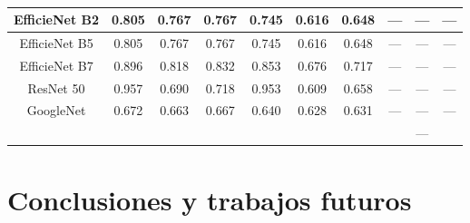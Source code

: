 \documentclass[a4paper,12pt,twoside,titlepage]{article}
\begin{document}
\begin{table}[h!]
\begin{tabular}{cccccccccc}
  \multicolumn{1}{|c|}{EfficieNet B2}          & \multicolumn{1}{c|}{0.805} & \multicolumn{1}{c|}{0.767} & \multicolumn{1}{c|}{0.767}      & \multicolumn{1}{c|}{0.745} & \multicolumn{1}{c|}{0.616} & \multicolumn{1}{c|}{0.648}      & \multicolumn{1}{c|}{---}   & \multicolumn{1}{c|}{---}   & \multicolumn{1}{c|}{---}        \\ \hline
  \multicolumn{1}{|c|}{EfficieNet B5}          & \multicolumn{1}{c|}{0.805} & \multicolumn{1}{c|}{0.767} & \multicolumn{1}{c|}{0.767}      & \multicolumn{1}{c|}{0.745} & \multicolumn{1}{c|}{0.616} & \multicolumn{1}{c|}{0.648}      & \multicolumn{1}{c|}{---}   & \multicolumn{1}{c|}{---}   & \multicolumn{1}{c|}{---}        \\ \hline
  \multicolumn{1}{|c|}{EfficieNet B7}          & \multicolumn{1}{c|}{0.896} & \multicolumn{1}{c|}{0.818} & \multicolumn{1}{c|}{0.832}      & \multicolumn{1}{c|}{0.853} & \multicolumn{1}{c|}{0.676} & \multicolumn{1}{c|}{0.717}      & \multicolumn{1}{c|}{---}   & \multicolumn{1}{c|}{---}   & \multicolumn{1}{c|}{---}        \\ \hline
  \multicolumn{1}{|c|}{ResNet 50}              & \multicolumn{1}{c|}{0.957} & \multicolumn{1}{c|}{0.690} & \multicolumn{1}{c|}{0.718}      & \multicolumn{1}{c|}{0.953} & \multicolumn{1}{c|}{0.609} & \multicolumn{1}{c|}{0.658}      & \multicolumn{1}{c|}{---}   & \multicolumn{1}{c|}{---}   & \multicolumn{1}{c|}{---}        \\ \hline
  \multicolumn{1}{|c|}{GoogleNet}              & \multicolumn{1}{c|}{0.672} & \multicolumn{1}{c|}{0.663} & \multicolumn{1}{c|}{0.667}      & \multicolumn{1}{c|}{0.640} & \multicolumn{1}{c|}{0.628} & \multicolumn{1}{c|}{0.631}      & \multicolumn{1}{c|}{---}   & \multicolumn{1}{c|}{---}   & \multicolumn{1}{c|}{---}        \\ \hline
  \multicolumn{1}{l}{}                         & \multicolumn{1}{l}{}       & \multicolumn{1}{l}{}       & \multicolumn{1}{l}{}            & \multicolumn{1}{l}{}       & \multicolumn{1}{l}{}       & \multicolumn{1}{l}{}            & \multicolumn{1}{l}{}       & ---                        & \multicolumn{1}{l}{}           
  \end{tabular}
  \caption{}
  \label{tab:my-table}
  \end{table}
\section{Conclusiones y trabajos futuros}


\newpage

\printbibliography[title={Bibliografía}]
\end{document}
